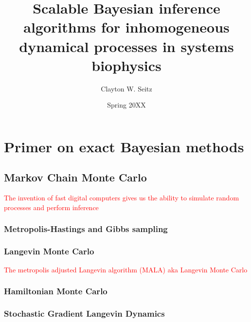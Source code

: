 \documentclass{ucetd}
\title{Scalable Bayesian inference algorithms for inhomogeneous dynamical processes
in systems biophysics}
\author{Clayton W. Seitz}
\date{Spring 20XX}
\begin{document}
\maketitle

\makecopyright


\tableofcontents


\abstract



\clearpage

\mainmatter

\chapter{Primer on exact Bayesian methods}

\section{Markov Chain Monte Carlo}

\textcolor{red}{The invention of fast digital computers gives us the ability to simulate random processes and perform inference}

\subsection{Metropolis-Hastings and Gibbs sampling}

\subsection{Langevin Monte Carlo} 

\textcolor{red}{The metropolis adjusted Langevin algorithm (MALA) aka Langevin Monte Carlo}

\subsection{Hamiltonian Monte Carlo}

\subsection{Stochastic Gradient Langevin Dynamics}
\end{document}

